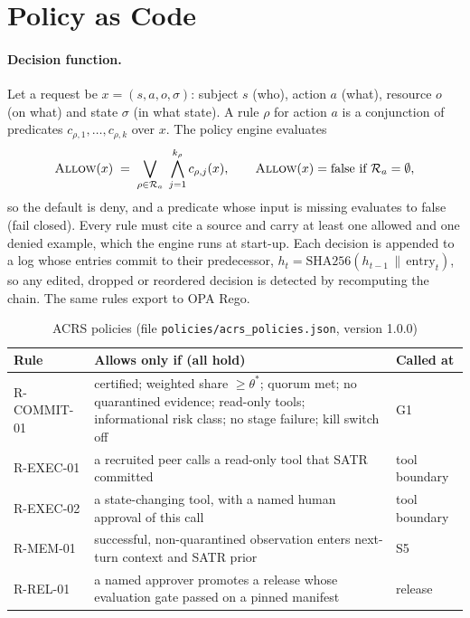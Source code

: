 \section{Policy as Code}
\label{sec:gov-pac}

\paragraph{Decision function.}
Let a request be $x=(s,a,o,\sigma)$: subject $s$ (who), action $a$ (what), resource $o$ (on what) and
state $\sigma$ (in what state). A rule $\rho$ for action $a$ is a conjunction of predicates
$c_{\rho,1},\dots,c_{\rho,k}$ over $x$. The policy engine evaluates
\begin{equation}
  \textsc{Allow}(x) \;=\; \bigvee_{\rho \in \mathcal{R}_a} \;\bigwedge_{j=1}^{k_\rho} c_{\rho,j}(x),
  \qquad \textsc{Allow}(x)=\text{false if } \mathcal{R}_a=\emptyset ,
  \label{eq:gov-allow}
\end{equation}
so the default is deny, and a predicate whose input is missing evaluates to false (fail closed).
Every rule must cite a source and carry at least one allowed and one denied example, which the engine
runs at start-up. Each decision is appended to a log whose entries commit to their predecessor,
$h_t = \mathrm{SHA256}(h_{t-1} \,\|\, \text{entry}_t)$, so any edited, dropped or reordered decision is
detected by recomputing the chain. The same rules export to OPA Rego.

\begin{table}[htbp]
  \centering
  \caption{ACRS policies (file \texttt{policies/acrs\_policies.json}, version 1.0.0)}
  \label{tab:gov-rules}
  \footnotesize
  \begin{tabular}{@{}lp{}l@{}}
    \toprule
    Rule & Allows only if (all hold) & Called at \\
    \midrule
    R-COMMIT-01 & certified; weighted share $\ge \theta^\ast$; quorum met; no quarantined evidence; read-only tools; informational risk class; no stage failure; kill switch off & G1 \\
    R-EXEC-01 & a recruited peer calls a read-only tool that SATR committed & tool boundary \\
    R-EXEC-02 & a state-changing tool, with a named human approval of this call & tool boundary \\
    R-MEM-01 & successful, non-quarantined observation enters next-turn context and SATR prior & S5 \\
    R-REL-01 & a named approver promotes a release whose evaluation gate passed on a pinned manifest & release \\
    \bottomrule
  \end{tabular}
\end{table}

